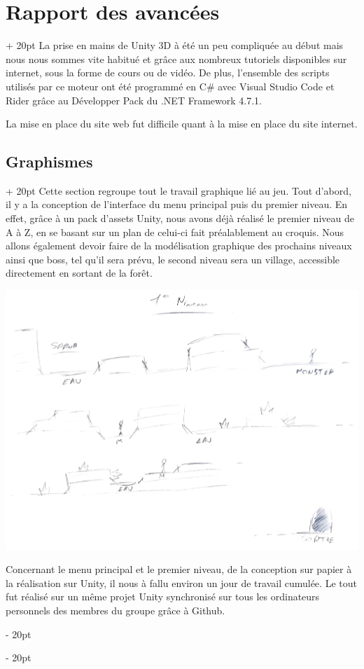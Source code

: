 \documentclass[a4paper, 12pt, twoside]{article}
\newcommand{\ind}[1][20pt]{\advance\leftskip + #1}
\newcommand{\deind}[1][20pt]{\advance\leftskip - #1}
\newenvironment{indt}[2][20pt]{#2 \par \ind[#1]}{\par \deind} %
\begin{document}
    \newpage

    \begin{indt}{\section{Rapport des avancées}}
        La prise en mains de Unity 3D à été un peu compliquée au début mais nous nous sommes vite habitué et grâce aux nombreux tutoriels disponibles sur internet, sous la forme de cours ou de vidéo. De plus, l'ensemble des scripts utilisés par ce moteur ont été programmé en C$\#$ avec Visual Studio Code et Rider grâce au Développer Pack du .NET Framework 4.7.1.

        La mise en place du site web fut difficile quant à la mise en place du site internet.

        \begin{indt}{\subsection{Graphismes}}
            Cette section regroupe tout le travail graphique lié au jeu. Tout d'abord, il y a la conception de l'interface du menu principal puis du premier niveau. En effet, grâce à un pack d'assets Unity, nous avons déjà réalisé le premier niveau de A à Z, en se basant sur un plan de celui-ci fait préalablement au croquis. Nous allons également devoir faire de la modélisation graphique des prochains niveaux ainsi que boss, tel qu'il sera prévu, le second niveau sera un village, accessible directement en sortant de la forêt.

            \begin{center}
                \includegraphics[width=0.5\linewidth]{Croquis.jpg}
            \end{center}

            Concernant le menu principal et le premier niveau, de la conception sur papier à la réalisation sur Unity, il nous à fallu environ un jour de travail cumulée. Le tout fut réalisé sur un même projet Unity synchronisé sur tous les ordinateurs personnels des membres du groupe grâce à Github.


\end{indt}
\end{indt}
\end{document}
